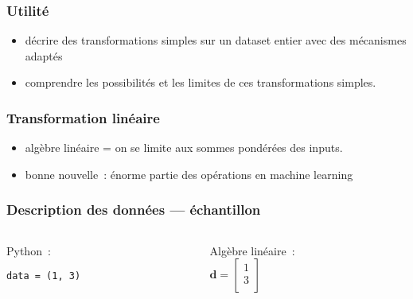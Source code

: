 \begin{frame}
  \frametitle{Utilité}

  \begin{itemize}
  \item décrire des transformations simples sur un dataset entier avec
    des mécanismes adaptés
  \item comprendre les possibilités et les limites de ces
    transformations simples.
  \end{itemize}
\end{frame}

\begin{frame}
  \frametitle{Transformation linéaire}

  \begin{itemize}
  \item algèbre linéaire = on se limite aux sommes pondérées des
    inputs.
  \item bonne nouvelle : énorme partie des opérations en machine
    learning
  \end{itemize}
\end{frame}

\begin{frame}[fragile]
  \frametitle{Description des données — échantillon}
  \begin{columns}
    \begin{column}{0.5\textwidth}
      Python :
      \begin{verbatim}
data = (1, 3)
      \end{verbatim}
    \end{column}
    \begin{column}{0.5\textwidth}
      Algèbre linéaire : \\[.3cm]

      \( \mathbf{d} = \begin{bmatrix}
        1 \\
        3 \\
      \end{bmatrix}
      \)
    \end{column}
  \end{columns}
\end{frame}

